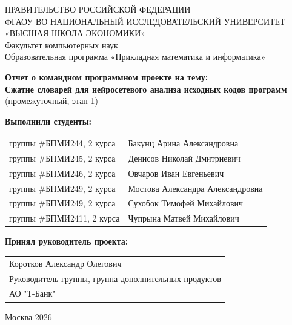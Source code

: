 \begin{titlepage}
	\newpage
	
	{
		\begin{center}
			ПРАВИТЕЛЬСТВО РОССИЙСКОЙ ФЕДЕРАЦИИ\\
			ФГАОУ ВО НАЦИОНАЛЬНЫЙ ИССЛЕДОВАТЕЛЬСКИЙ УНИВЕРСИТЕТ\\
			«ВЫСШАЯ ШКОЛА ЭКОНОМИКИ»
			\\
			\bigskip
			Факультет компьютерных наук\\
			Образовательная программа «Прикладная математика и информатика»
		\end{center}
	}
	
	\vspace{2em}
	\vspace{4em}
	
	\begin{center}
		{\bf Отчет о командном программном проекте на тему:}\\
		{\bf Сжатие словарей для нейросетевого анализа исходных кодов программ}\\
		(промежуточный, этап 1)
	\end{center}
	
	\vspace{2em}
	
	{\bf Выполнили студенты: \vspace{2mm}}
	
	{
		\begin{tabular}{l@{\hskip 1.5cm}l}
			группы \#БПМИ244, 2 курса & Бакунц Арина Александровна \\
			группы \#БПМИ245, 2 курса & Денисов Николай Дмитриевич \\
			группы \#БПМИ246, 2 курса & Овчаров Иван Евгеньевич \\
			группы \#БПМИ249, 2 курса & Мостова Александра Александровна \\
			группы \#БПМИ249, 2 курса & Сухобок Тимофей Михайлович \\
			группы \#БПМИ2411, 2 курса & Чупрына Матвей Михайлович
	\end{tabular}}
	
	\vspace{1em}
	{\bf Принял руководитель проекта: \vspace{2mm}}
	
	{
		\begin{tabular}{l}
			Коротков Александр Олегович\\
			Руководитель группы, группа дополнительных продуктов\\
			АО "Т-Банк"
	\end{tabular}}
	
	\vspace{\fill}
	
	\begin{center}
		Москва 2026
	\end{center}
	
\end{titlepage}
